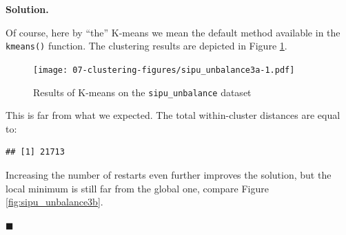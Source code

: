 \documentclass[10pt,b5paper,krantz1]{krantz}
\newenvironment{Shaded}{\begin{snugshade}}{\end{snugshade}}
\newcommand{\DataTypeTok}[1]{\textcolor[rgb]{0.27,0.27,0.27}{#1}}
\newcommand{\DecValTok}[1]{\textcolor[rgb]{0.06,0.06,0.06}{#1}}
\newcommand{\KeywordTok}[1]{\textcolor[rgb]{0.27,0.27,0.27}{\textbf{#1}}}
\newcommand{\NormalTok}[1]{#1}
\newcommand{\OperatorTok}[1]{\textcolor[rgb]{0.43,0.43,0.43}{\textbf{#1}}}
\newcommand{\StringTok}[1]{\textcolor[rgb]{0.5,0.5,0.5}{#1}}
\newenvironment{solution}{%
\bigskip\noindent\textbf{Solution. }%
\it\ignorespaces%
\ignorespaces%
}{\ignorespaces%
\hfill$\blacksquare$%
}
\begin{document}
\begin{solution}

Of course, here by ``the'' K-means we mean the default method
available in the \texttt{kmeans()} function.
The clustering results are depicted in Figure \ref{fig:sipu_unbalance3a}.

\begin{Shaded}
\end{Shaded}

\begin{figure}
\hypertarget{fig:sipu_unbalance3a}{%
\centering
\texttt{[image: 07-clustering-figures/sipu\_unbalance3a-1.pdf]}
\caption{Results of K-means on the \texttt{sipu\_unbalance} dataset}\label{fig:sipu_unbalance3a}
}
\end{figure}

This is far from what we expected.
The total within-cluster distances are equal to:

\begin{Shaded}
\end{Shaded}

\begin{verbatim}
## [1] 21713
\end{verbatim}

Increasing the number of restarts even further improves the solution,
but the local minimum is still far from the global one,
compare Figure \ref{fig:sipu_unbalance3b}.

\begin{Shaded}
\end{Shaded}


\end{solution}
\end{document}
